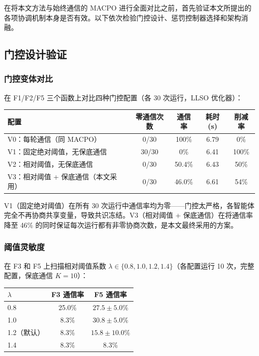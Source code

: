 \documentclass[11pt,a4paper]{ctexart}
\begin{document}
在将本文方法与始终通信的 MACPO 进行全面对比之前，首先验证本文所提出的各项协调机制本身是否有效。以下依次检验门控设计、惩罚控制器选择和架构消融。

\subsection{门控设计验证}

\subsubsection{门控变体对比}
在 F1/F2/F5 三个函数上对比四种门控配置（各 30 次运行，LLSO 优化器）：

\begin{center}\small
\begin{tabular}{@{}lcccc@{}}
\toprule
配置 & 零通信次数 & 通信率 & 耗时(s) & 削减率 \\
\midrule
V0：每轮通信（同 MACPO） & 0/30 & 100\% & 6.79 & 0\% \\
V1：固定绝对阈值，无保底通信 & 30/30 & 0\% & 6.41 & 100\% \\
V2：相对阈值，无保底通信 & 0/30 & 50.4\% & 6.43 & 50\% \\
V3：相对阈值 + 保底通信（本文采用） & 0/30 & 46.0\% & 6.61 & 54\% \\
\bottomrule
\end{tabular}
\end{center}

V1（固定绝对阈值）在所有 30 次运行中通信率均为零——门控太严格，各智能体完全不再协商共享变量，导致共识冻结。V3（相对阈值 + 保底通信）在将通信率降至 46\% 的同时保证每次运行都有非零协商次数，是本文最终采用的方案。

\subsubsection{阈值灵敏度}
在 F3 和 F5 上扫描相对阈值系数 $\lambda \in \{0.8, 1.0, 1.2, 1.4\}$（各配置运行 10 次，完整配置，保底通信 $K=10$）：

\begin{center}\small
\begin{tabular}{@{}lcc@{}}
\toprule
$\lambda$ & F3 通信率 & F5 通信率 \\
\midrule
0.8 & 25.0\% & $27.5\pm5.0\%$ \\
1.0 & 8.3\% & $30.8\pm5.0\%$ \\
1.2（默认） & 8.3\% & $15.8\pm10.0\%$ \\
1.4 & 8.3\% & 8.3\% \\
\bottomrule
\end{tabular}
\end{center}
\end{document}
